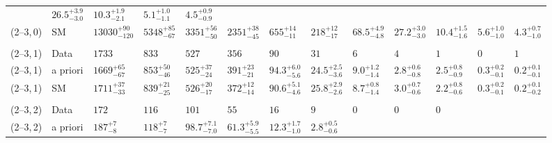 \begin{table}[!t]
{\begin{tabular}{ lllllllllllll }
             & $26.5^{+3.9}_{-3.0}$
             & $10.3^{+1.9}_{-2.1}$
             & $5.1^{+1.0}_{-1.1}$
             & $4.5^{+0.9}_{-0.9}$                      \\
    (2--3,\,0)
             & SM
             & $13030^{+90}_{-120}$
             & $5348^{+85}_{-67}$
             & $3351^{+56}_{-50}$
             & $2351^{+38}_{-45}$
             & $655^{+14}_{-11}$
             & $218^{+12}_{-17}$
             & $68.5^{+4.9}_{-4.8}$
             & $27.2^{+3.0}_{-3.0}$
             & $10.4^{+1.5}_{-1.6}$
             & $5.6^{+1.0}_{-1.0}$
             & $4.3^{+0.7}_{-1.0}$                      \\\\[-2ex]
    (2--3,\,1)
             & Data
             & $1733$
             & $833$
             & $527$
             & $356$
             & $90$
             & $31$
             & $6$
             & $4$
             & $1$
             & $0$
             & $1$                                      \\
    (2--3,\,1)
             & a priori
             & $1669^{+65}_{-67}$
             & $853^{+50}_{-46}$
             & $525^{+37}_{-24}$
             & $391^{+23}_{-21}$
             & $94.3^{+6.0}_{-5.6}$
             & $24.5^{+2.5}_{-3.6}$
             & $9.0^{+1.2}_{-1.4}$
             & $2.8^{+0.6}_{-0.8}$
             & $2.5^{+0.8}_{-0.9}$
             & $0.3^{+0.2}_{-0.1}$
             & $0.2^{+0.1}_{-0.1}$                      \\
    (2--3,\,1)
             & SM
             & $1711^{+37}_{-33}$
             & $839^{+21}_{-25}$
             & $526^{+20}_{-17}$
             & $372^{+12}_{-14}$
             & $90.6^{+5.1}_{-4.6}$
             & $25.8^{+2.9}_{-2.6}$
             & $8.7^{+0.8}_{-1.4}$
             & $3.0^{+0.7}_{-0.6}$
             & $2.2^{+0.8}_{-0.6}$
             & $0.3^{+0.2}_{-0.1}$
             & $0.2^{+0.1}_{-0.2}$                      \\\\[-2ex]
    (2--3,\,2)
             & Data
             & $172$
             & $116$
             & $101$
             & $55$
             & $16$
             & $9$
             & $0$
             & $0$
             & $0$                                      \\
    (2--3,\,2)
             & a priori
             & $187^{+7}_{-8}$
             & $118^{+7}_{-7}$
             & $98.7^{+7.1}_{-7.0}$
             & $61.3^{+5.9}_{-5.5}$
             & $12.3^{+1.7}_{-1.0}$
             & $2.8^{+0.5}_{-0.6}$

\end{tabular}}
\end{table}
